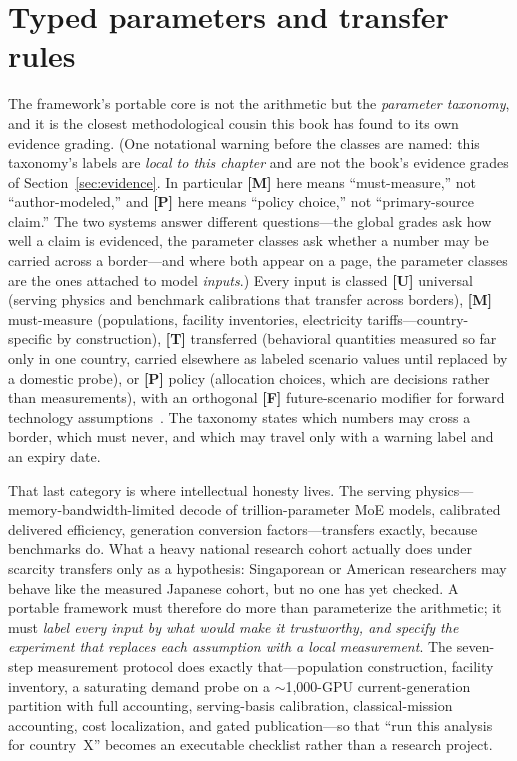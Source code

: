 \section{Typed parameters and transfer rules}

The framework's portable core is not the arithmetic but the \emph{parameter taxonomy}, and it is the closest methodological cousin this book has found to its own evidence grading. (One notational warning before the classes are named: this taxonomy's labels are \emph{local to this chapter} and are not the book's evidence grades of Section~\ref{sec:evidence}. In particular \textbf{[M]} here means ``must-measure,'' not ``author-modeled,'' and \textbf{[P]} here means ``policy choice,'' not ``primary-source claim.'' The two systems answer different questions---the global grades ask how well a claim is evidenced, the parameter classes ask whether a number may be carried across a border---and where both appear on a page, the parameter classes are the ones attached to model \emph{inputs}.) Every input is classed \textbf{[U]} universal (serving physics and benchmark calibrations that transfer across borders), \textbf{[M]} must-measure (populations, facility inventories, electricity tariffs---country-specific by construction), \textbf{[T]} transferred (behavioral quantities measured so far only in one country, carried elsewhere as labeled scenario values until replaced by a domestic probe), or \textbf{[P]} policy (allocation choices, which are decisions rather than measurements), with an orthogonal \textbf{[F]} future-scenario modifier for forward technology assumptions~\cite{ai4s-framework}. The taxonomy states which numbers may cross a border, which must never, and which may travel only with a warning label and an expiry date.

That last category is where intellectual honesty lives. The serving physics---memory-bandwidth-limited decode of trillion-parameter MoE models, calibrated delivered efficiency, generation conversion factors---transfers exactly, because benchmarks do. What a heavy national research cohort actually does under scarcity transfers only as a hypothesis: Singaporean or American researchers may behave like the measured Japanese cohort, but no one has yet checked. A portable framework must therefore do more than parameterize the arithmetic; it must \emph{label every input by what would make it trustworthy, and specify the experiment that replaces each assumption with a local measurement}. The seven-step measurement protocol does exactly that---population construction, facility inventory, a saturating demand probe on a $\sim$1,000-GPU current-generation partition with full accounting, serving-basis calibration, classical-mission accounting, cost localization, and gated publication---so that ``run this analysis for country~X'' becomes an executable checklist rather than a research project.

